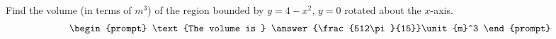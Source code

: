 \documentclass{ximera}
\author{Gregory Hartman \and Matthew Carr}
\begin{document}
\begin{exercise}






Find the volume (in terms of $\unit{m}^3$) of the region bounded by $y=4-x^2$, $y=0$ rotated about the $x$-axis.
\[
\begin{prompt}
\text{The volume is } \answer{\frac{512\pi}{15}}\unit{m}^3
\end{prompt}
\]




\end{exercise}
\end{document}
